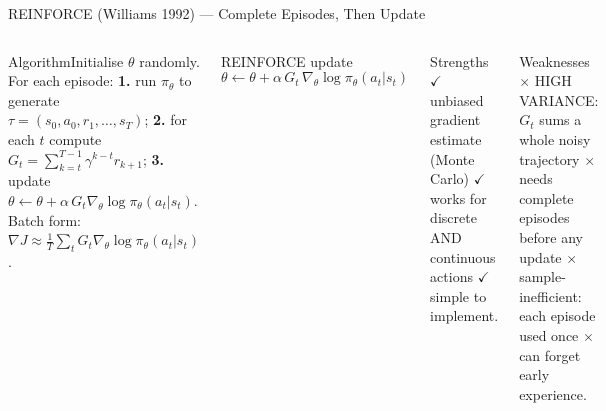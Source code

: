 \documentclass[aspectratio=169,10pt,t]{beamer}
\begin{document}
\begin{frame}{REINFORCE (Williams 1992) --- Complete Episodes, Then Update}
\begin{columns}[T]
\begin{cbox}{Algorithm}\scriptsize Initialise $\theta$ randomly. For each episode: \textbf{1.} run $\pi_\theta$ to generate $\tau=(s_0,a_0,r_1,\ldots,s_T)$; \textbf{2.} for each $t$ compute $G_t=\sum_{k=t}^{T-1}\gamma^{k-t}r_{k+1}$; \textbf{3.} update $\theta\leftarrow\theta+\alpha\,G_t\nabla_\theta\log\pi_\theta(a_t|s_t)$. Batch form: $\nabla J\approx\frac1T\sum_tG_t\nabla_\theta\log\pi_\theta(a_t|s_t)$.\end{cbox}
\begin{fbx}{REINFORCE update}\[\theta\leftarrow\theta+\alpha\,G_t\,\nabla_\theta\log\pi_\theta(a_t|s_t)\]\end{fbx}
\begin{cbox}[ISSAgrn]{Strengths}\scriptsize $\checkmark$ unbiased gradient estimate (Monte Carlo) $\checkmark$ works for discrete AND continuous actions $\checkmark$ simple to implement.\end{cbox}
\begin{cbox}[ISSAred]{Weaknesses}\scriptsize $\times$ HIGH VARIANCE: $G_t$ sums a whole noisy trajectory $\times$ needs complete episodes before any update $\times$ sample-inefficient: each episode used once $\times$ can forget early experience.\end{cbox}
\end{columns}
\end{frame}
\end{document}
